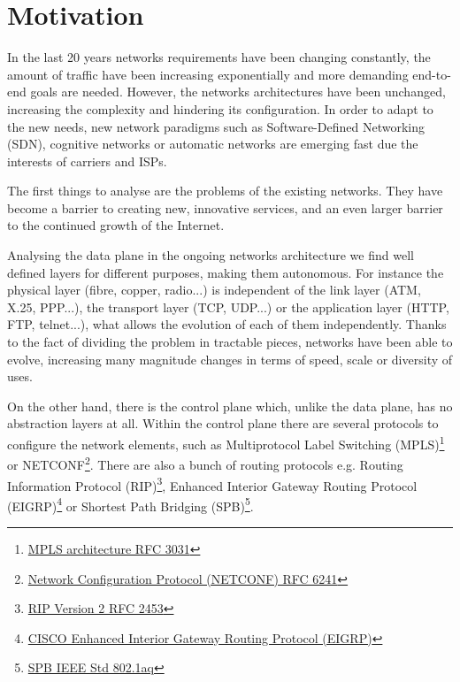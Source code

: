 \section{Motivation}
\label{sec:motivation}

In the last 20 years networks requirements have been changing constantly, the amount of traffic have been increasing exponentially and more demanding end-to-end goals are needed. However, the networks architectures have been unchanged, increasing the complexity and hindering its configuration. In order to adapt to the new needs, new network paradigms such as Software-Defined Networking (SDN), cognitive networks or automatic networks are emerging fast due the interests of carriers and ISPs.

The first things to analyse are the problems of the existing networks. They have become a barrier to creating new, innovative services, and an even larger barrier to the continued growth of the Internet. 

Analysing the data plane in the ongoing networks architecture we find well defined layers for different purposes, making them autonomous. For instance the physical layer (fibre, copper, radio...) is independent of the link layer (ATM, X.25, PPP...), the transport layer (TCP, UDP...) or the application layer (HTTP, FTP, telnet...), what allows the evolution of each of them independently. Thanks to the fact of dividing the problem in tractable pieces, networks have been able to evolve, increasing many magnitude changes in terms of speed, scale or diversity of uses.

On the other hand, there is the control plane which, unlike the data plane, has no abstraction layers at all. Within the control plane there are  several protocols to configure the network elements, such as Multiprotocol Label Switching (MPLS)\footnote{\href{http://www.ietf.org/rfc/rfc3031.txt}{MPLS architecture RFC 3031}} or NETCONF\footnote{\href{http://tools.ietf.org/html/rfc6241}{Network Configuration Protocol (NETCONF) RFC 6241}}. There are also a bunch of routing protocols e.g. Routing Information Protocol (RIP)\footnote{\href{http://tools.ietf.org/html/rfc2453}{RIP Version 2 RFC 2453}}, Enhanced Interior Gateway Routing Protocol (EIGRP)\footnote{\href{http://www.cisco.com/c/en/us/products/ios-nx-os-software/enhanced-interior-gateway-routing-protocol-eigrp/index.html}{CISCO Enhanced Interior Gateway Routing Protocol (EIGRP)}} or Shortest Path Bridging (SPB)\footnote{\href{http://standards.ieee.org/getieee802/download/802.1aq-2012.pdf}{SPB IEEE Std 802.1aq}}. 

